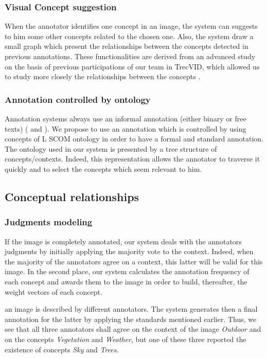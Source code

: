 	\subsubsection{Visual Concept suggestion}
When the annotator identifies one concept in an image, the
system can suggests to him some other concepts related
to the chosen one. Also, the system draw a small graph
which present the relationships between the concepts detected in previous annotations. These functionalities are derived from an advanced study on the basis of previous participations of our team in TrecVID, which allowed us to study more closely the relationships between the concepts \cite{Elleuch2011}.
	\subsubsection{Annotation controlled by ontology}

Annotation systems always use an informal annotation (either binary or free texts) (\cite{Volkmer2005} and \cite{Ayache2007}). We propose to
use an annotation which is controlled by using concepts of
L SCOM ontology in order to have a formal and standard annotation. The ontology used in our system is presented by a
tree structure of concepts/contexts. Indeed, this representation allows the annotator to traverse it quickly and to select
the concepts which seem relevant to him.

\subsection{Conceptual relationships}
	\subsubsection{Judgments modeling}
If the image is completely annotated, our system deals with
the annotators judgments by initially applying the majority vote to the context. Indeed, when the majority of the
annotators agree on a context, this latter will be valid for
this image. In the second place, our system calculates the
annotation frequency of each concept and awards them to
the image in order to build, thereafter, the weight vectors of
each concept.

an image is described by different annotators. The system generates then a final annotation for the
latter by applying the standards mentioned earlier. Thus,
we see that all three annotators shall agree on the context
of the image \textit{Outdoor} and on the concepts \textit{Vegetation} and
\textit{Weather}, but one of these three reported the existence of
concepts \textit{Sky} and \textit{Trees}.
